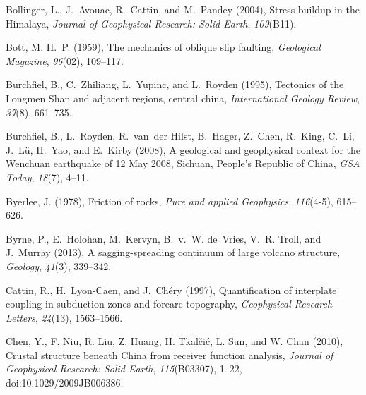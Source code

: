 \documentclass[twocolumn,jgrga]{AGUTeX}
\begin{document}
\begin{article}
{{{\begin{thebibliography}{89}
Bollinger, L., J.~Avouac, R.~Cattin, and M.~Pandey (2004), Stress buildup in
  the {H}imalaya, \textit{Journal of Geophysical Research: Solid Earth},
  \textit{109}(B11).

Bott, M. H.~P. (1959), The mechanics of oblique slip faulting,
  \textit{Geological Magazine}, \textit{96}(02), 109--117.

Burchfiel, B., C.~Zhiliang, L.~Yupinc, and L.~Royden (1995), Tectonics of the
  {L}ongmen {S}han and adjacent regions, central {}china, \textit{International
  Geology Review}, \textit{37}(8), 661--735.

Burchfiel, B., L.~Royden, R.~van~der Hilst, B.~Hager, Z.~Chen, R.~King, C.~Li,
  J.~L{\"u}, H.~Yao, and E.~Kirby (2008), A geological and geophysical context
  for the {W}enchuan earthquake of 12 {M}ay 2008, {S}ichuan, {P}eople's
  {R}epublic of {C}hina, \textit{GSA Today}, \textit{18}(7), 4--11.

Byerlee, J. (1978), Friction of rocks, \textit{Pure and applied Geophysics},
  \textit{116}(4-5), 615--626.

Byrne, P., E.~Holohan, M.~Kervyn, B.~v.~W. de~Vries, V.~R. Troll, and J.~Murray
  (2013), A sagging-spreading continuum of large volcano structure,
  \textit{Geology}, \textit{41}(3), 339--342.

Cattin, R., H.~Lyon-Caen, and J.~Ch{\'e}ry (1997), Quantification of interplate
  coupling in subduction zones and forearc topography, \textit{Geophysical
  Research Letters}, \textit{24}(13), 1563--1566.

Chen, Y., F. Niu, R. Liu, Z. Huang, H. Tkal{\v{c}}i{\'c}, L. Sun, and
  W. Chan (2010), Crustal structure beneath {C}hina from receiver function
  analysis, \textit{Journal of Geophysical Research: Solid Earth}, 
  \textit{115}(B03307), 1--22, doi:10.1029/2009JB006386.


\end{thebibliography}}}}
\end{article}
\end{document}
